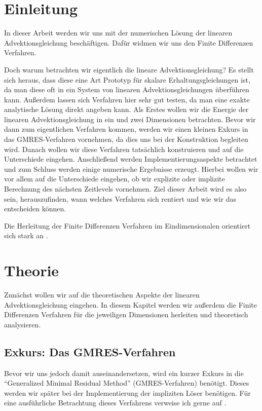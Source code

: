 \documentclass[12pt,a4paper]{scrartcl}
\numberwithin{equation}{section} %
\theoremstyle{definition}
\theoremstyle{plain}
\begin{document}
\section{Einleitung}
In dieser Arbeit werden wir uns mit der numerischen Lösung der linearen Advektionsgleichung beschäftigen. Dafür widmen wir uns den Finite Differenzen Verfahren.
\par Doch warum betrachten wir eigentlich die lineare Advektionsgleichung? Es stellt sich heraus, dass diese eine Art Prototyp für skalare Erhaltungsgleichungen ist, da man diese oft in ein System von linearen Advektionsgleichungen überführen kann. Außerdem lassen sich Verfahren hier sehr gut testen, da man eine exakte analytische Lösung direkt angeben kann.
Als Erstes wollen wir die Energie der linearen Advektionsgleichung in ein und zwei Dimensionen betrachten. Bevor wir dann zum eigentlichen Verfahren kommen, werden wir einen kleinen Exkurs in das GMRES-Verfahren vornehmen, da dies uns bei der Konstruktion begleiten wird.
Danach wollen wir diese Verfahren tatsächlich konstruieren und auf die Unterschiede eingehen. Anschließend werden Implementierungsaspekte betrachtet und zum Schluss werden einige numerische Ergebnisse erzeugt. Hierbei wollen wir vor allem auf die Unterschiede eingehen, ob wir explizite oder implizite Berechnung des nächsten Zeitlevels vornehmen. Ziel dieser Arbeit wird es also sein, herauszufinden, wann welches Verfahren sich rentiert und wie wir das entscheiden können.
\par Die Herleitung der Finite Differenzen Verfahren im Eindimensionalen orientiert sich stark an \cite{Gas}.
\section{Theorie}
Zunächst wollen wir auf die theoretischen Aspekte der linearen Advektionsgleichung eingehen. In diesem Kapitel werden wir außerdem die Finite Differenzen Verfahren für die jeweiligen Dimensionen herleiten und theoretisch analysieren. 
\subsection{Exkurs: Das GMRES-Verfahren}
Bevor wir uns jedoch damit auseinandersetzen, wird ein kurzer Exkurs in die "`Generalized Minimal Residual Method"' (GMRES-Verfahren) benötigt. Dieses werden wir später bei der Implementierung der impliziten Löser benötigen. Für eine ausführliche Betrachtung dieses Verfahrens verweise ich gerne auf \cite{SaadSchultz}.
\end{document}
